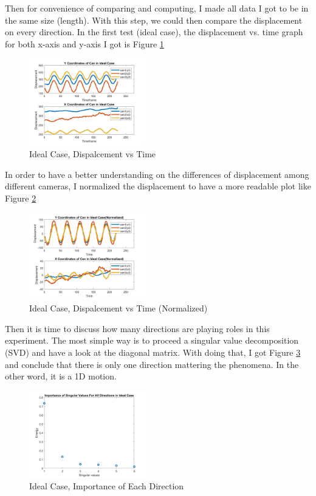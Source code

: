 \documentclass[twoside,twocolumn]{article}
\begin{document}
    Then for convenience of comparing and computing, I made all data I got to be in the same size (length). With this
    step, we could then compare the displacement on every direction. In the first test (ideal case), the displacement vs.
    time graph for both x-axis and y-axis I got is Figure \ref{fig:test1_1}
    \begin{figure}[h]
        \includegraphics[width = 0.45\textwidth]{test1_1.jpg}
        \caption{Ideal Case, Dispalcement vs Time}
        \label{fig:test1_1}
    \end{figure}
    In order to have a better understanding on the differences of displacement among different cameras, I normalized the 
    displacement to have a more readable plot like Figure \ref{fig:test1_2}
    \begin{figure}[h]
        \includegraphics[width = 0.45\textwidth]{test1_2.jpg}
        \caption{Ideal Case, Dispalcement vs Time (Normalized)}
        \label{fig:test1_2}
    \end{figure}
    Then it is time to discuss how many directions are playing roles in this experiment. The most simple way is to proceed
    a singular value decomposition (SVD) and have a look at the diagonal matrix. With doing that, I got Figure 
    \ref{fig:test1_3} and conclude that there is only one direction mattering the phenomena. In the other word, it is a 
    1D motion.
    \begin{figure}[h]
        \includegraphics[width = 0.45\textwidth]{test1_3.jpg}
        \caption{Ideal Case, Importance of Each Direction}
        \label{fig:test1_3}
    \end{figure}
\end{document}
